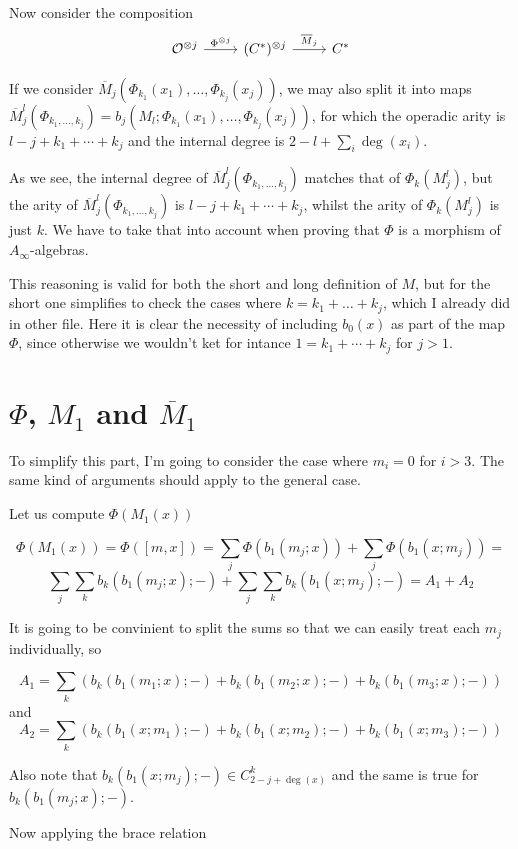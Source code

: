 \documentclass[twoside]{article}
\begin{document}
Now consider the composition
\[
\begin{tikzcd}
\OO^{\otimes j}\arrow[r,"\Phi^{\otimes j}"] &(C^*)^{\otimes j}\arrow[r, "\overline{M}_j"] & C^*
\end{tikzcd}
\]

If we consider $\overline{M}_j(\Phi_{k_1}(x_1),\dots, \Phi_{k_j}(x_j))$, we may also split it into maps $\overline{M}_j^l(\Phi_{k_1,\dots, k_j})=b_j(M_l;\Phi_{k_1}(x_1),\dots, \Phi_{k_j}(x_j))$, for which the operadic arity is $l-j+k_1+\cdots+k_j$ and the internal degree is $2-l+\sum_i\deg(x_i)$. 

As we see, the internal degree of $\overline{M}_j^l(\Phi_{k_1,\dots, k_j})$ matches that of $\Phi_k(M_j^l)$, but the arity of $\overline{M}_j^l(\Phi_{k_1,\dots, k_j})$ is $l-j+k_1+\cdots+k_j$, whilst the arity of $\Phi_k(M_j^l)$ is just $k$. We have to take that into account when proving that $\Phi$ is a morphism of $A_\infty$-algebras.

This reasoning is valid for both the short and long definition of $M$, but for the short one simplifies to check the cases where $k=k_1+\dots+k_j$, which I already did in other file. Here it is clear the necessity of including $b_0(x)$ as part of the map $\Phi$, since otherwise we wouldn't ket for intance $1=k_1+\cdots+k_j$ for $j>1$. 

\section{$\Phi$, $M_1$ and $\overline{M}_1$}

To simplify this part, I'm going to consider the case where $m_i=0$ for $i>3$. The same kind of arguments should apply to the general case.

Let us compute $\Phi(M_1(x))$ 

$$\Phi(M_1(x))=\Phi([m,x])=\sum_j\Phi(b_1(m_j;x))+\sum_j\Phi(b_1(x;m_j))=$$
$$\sum_j\sum_k b_k(b_1(m_j;x);-)+\sum_j\sum_k b_k(b_1(x;m_j);-)=A_1+A_2$$

It is going to be convinient to split the sums so that we can easily treat each $m_j$ individually, so

$$A_1=\sum_k (b_k(b_1(m_1;x);-)+b_k(b_1(m_2;x);-)+b_k(b_1(m_3;x);-))$$
and
$$A_2=\sum_k (b_k(b_1(x;m_1);-)+b_k(b_1(x;m_2);-)+b_k(b_1(x;m_3);-))$$

Also note that $b_k(b_1(x;m_j);-)\in C^k_{2-j+\deg(x)}$ and the same is true for $b_k(b_1(m_j;x);-)$.

Now applying the brace relation
\end{document}
